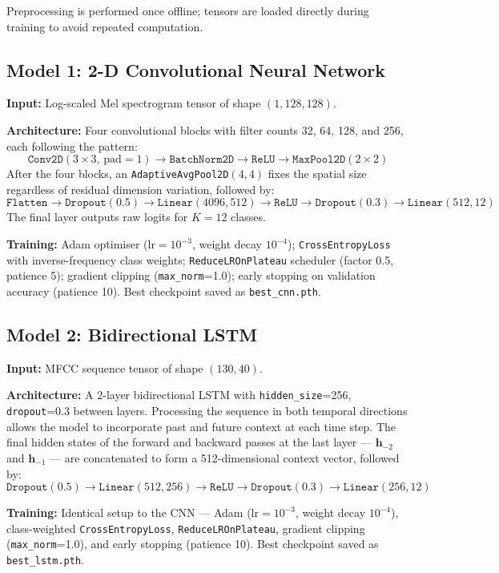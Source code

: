 \documentclass[12pt, a4paper]{article}
\begin{document}
Preprocessing is performed once offline; tensors are loaded directly during training to
avoid repeated computation.

\subsection{Model 1: 2-D Convolutional Neural Network}
\label{subsec:cnn}

\textbf{Input:} Log-scaled Mel spectrogram tensor of shape $(1, 128, 128)$.

\textbf{Architecture:} Four convolutional blocks with filter counts 32, 64, 128, and
256, each following the pattern:
\[
\texttt{Conv2D}(3{\times}3,\,\text{pad}=1) \to \texttt{BatchNorm2D} \to \texttt{ReLU} \to \texttt{MaxPool2D}(2{\times}2)
\]
After the four blocks, an \texttt{AdaptiveAvgPool2D}$(4,4)$ fixes the spatial size
regardless of residual dimension variation, followed by:
\[
\texttt{Flatten} \to \texttt{Dropout}(0.5) \to \texttt{Linear}(4096, 512) \to \texttt{ReLU} \to \texttt{Dropout}(0.3) \to \texttt{Linear}(512, 12)
\]
The final layer outputs raw logits for $K=12$ classes.

\textbf{Training:} Adam optimiser ($\text{lr}=10^{-3}$, weight decay $10^{-4}$);
\texttt{CrossEntropyLoss} with inverse-frequency class weights; \texttt{ReduceLROnPlateau}
scheduler (factor 0.5, patience 5); gradient clipping (\texttt{max\_norm}=1.0); early
stopping on validation accuracy (patience 10). Best checkpoint saved as
\texttt{best\_cnn.pth}.

\subsection{Model 2: Bidirectional LSTM}
\label{subsec:lstm}

\textbf{Input:} MFCC sequence tensor of shape $(130, 40)$.

\textbf{Architecture:} A 2-layer bidirectional LSTM with \texttt{hidden\_size}=256,
\texttt{dropout}=0.3 between layers. Processing the sequence in both temporal directions
allows the model to incorporate past and future context at each time step. The final
hidden states of the forward and backward passes at the last layer ---
$\mathbf{h}_{-2}$ and $\mathbf{h}_{-1}$ --- are concatenated to form a 512-dimensional
context vector, followed by:
\[
\texttt{Dropout}(0.5) \to \texttt{Linear}(512, 256) \to \texttt{ReLU} \to \texttt{Dropout}(0.3) \to \texttt{Linear}(256, 12)
\]

\textbf{Training:} Identical setup to the CNN --- Adam ($\text{lr}=10^{-3}$, weight
decay $10^{-4}$), class-weighted \texttt{CrossEntropyLoss}, \texttt{ReduceLROnPlateau},
gradient clipping (\texttt{max\_norm}=1.0), and early stopping (patience 10). Best
checkpoint saved as \texttt{best\_lstm.pth}.
\end{document}
